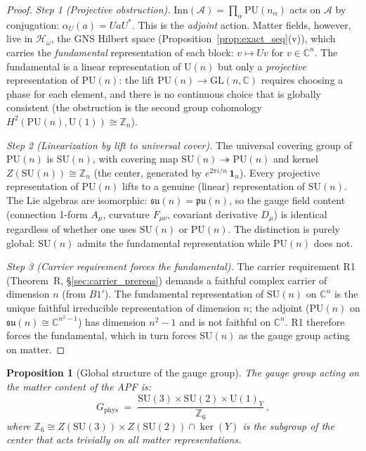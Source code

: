 \documentclass[11pt,a4paper]{article}
\newtheorem{proposition}[theorem]{Proposition}
\theoremstyle{definition}
\newcommand{\SU}{\mathrm{SU}}
\newcommand{\U}{\mathrm{U}}
\begin{document}
\begin{proof}
\textit{Step 1 (Projective obstruction).}\quad
$\mathrm{Inn}(\mathcal{A}) = \prod_\alpha \mathrm{PU}(n_\alpha)$ acts
on $\mathcal{A}$ by conjugation: $\alpha_U(a) = UaU^*$.  This is the
\emph{adjoint} action.  Matter fields, however, live in
$\mathcal{H}_\omega$, the GNS Hilbert space
(Proposition~\ref{prop:exact_seq}(v)), which carries the
\emph{fundamental} representation of each block: $v \mapsto Uv$ for
$v \in \mathbb{C}^n$.  The fundamental is a linear representation of
$\mathrm{U}(n)$ but only a \emph{projective} representation of
$\mathrm{PU}(n)$: the lift $\mathrm{PU}(n) \to \mathrm{GL}(n,
\mathbb{C})$ requires choosing a phase for each element, and there is
no continuous choice that is globally consistent (the obstruction is
the second group cohomology $H^2(\mathrm{PU}(n), \mathrm{U}(1))
\cong \mathbb{Z}_n$).

\textit{Step 2 (Linearization by lift to universal cover).}\quad
The universal covering group of $\mathrm{PU}(n)$ is $\SU(n)$, with
covering map $\SU(n) \twoheadrightarrow \mathrm{PU}(n)$ and kernel
$Z(\SU(n)) \cong \mathbb{Z}_n$ (the center, generated by
$e^{2\pi i / n}\,\mathbf{1}_n$).  Every projective representation of
$\mathrm{PU}(n)$ lifts to a genuine (linear) representation of
$\SU(n)$.  The Lie algebras are isomorphic:
$\mathfrak{su}(n) = \mathfrak{pu}(n)$, so the gauge field content
(connection 1-form $A_\mu$, curvature $F_{\mu\nu}$, covariant
derivative $D_\mu$) is identical regardless of whether one uses
$\SU(n)$ or $\mathrm{PU}(n)$.  The distinction is purely global:
$\SU(n)$ admits the fundamental representation while $\mathrm{PU}(n)$
does not.

\textit{Step 3 (Carrier requirement forces the fundamental).}\quad
The carrier requirement R1 (Theorem~R, \S\ref{sec:carrier_prereqs})
demands a faithful complex carrier of dimension $n$ (from $B1'$).
The fundamental representation of $\SU(n)$ on $\mathbb{C}^n$ is the
unique faithful irreducible representation of dimension $n$; the
adjoint ($\mathrm{PU}(n)$ on $\mathfrak{su}(n) \cong
\mathbb{C}^{n^2-1}$) has dimension $n^2 - 1$ and is not faithful on
$\mathbb{C}^n$.  R1 therefore forces the fundamental, which in turn
forces $\SU(n)$ as the gauge group acting on matter.
\end{proof}

\begin{proposition}[Global structure of the gauge group]%
\label{prop:global_structure}
The gauge group acting on the matter content of the APF is:
\[
  G_{\mathrm{phys}} \;=\;
  \frac{\SU(3) \times \SU(2) \times \U(1)_Y}{\mathbb{Z}_6}\,,
\]
where $\mathbb{Z}_6 \cong Z(\SU(3)) \times Z(\SU(2)) \cap \ker(Y)$
is the subgroup of the center that acts trivially on all matter
representations.
\end{proposition}
\end{document}

